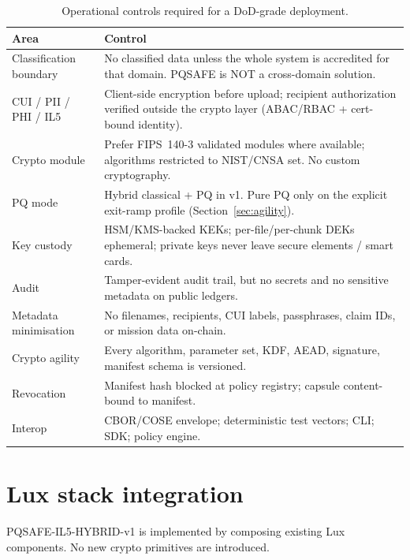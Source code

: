 \documentclass[11pt,a4paper]{article}
\begin{document}
\begin{table}[H]
\centering
\small
\begin{tabularx}{\linewidth}{l X}
\toprule
\textbf{Area} & \textbf{Control} \\
\midrule
Classification boundary & No classified data unless the whole system is accredited for that domain. PQSAFE is NOT a cross-domain solution. \\
CUI / PII / PHI / IL5 & Client-side encryption before upload; recipient authorization verified outside the crypto layer (ABAC/RBAC + cert-bound identity). \\
Crypto module & Prefer FIPS~140-3 validated modules where available; algorithms restricted to NIST/CNSA set. No custom cryptography. \\
PQ mode & Hybrid classical + PQ in v1. Pure PQ only on the explicit exit-ramp profile (Section~\ref{sec:agility}). \\
Key custody & HSM/KMS-backed KEKs; per-file/per-chunk DEKs ephemeral; private keys never leave secure elements / smart cards. \\
Audit & Tamper-evident audit trail, but no secrets and no sensitive metadata on public ledgers. \\
Metadata minimisation & No filenames, recipients, CUI labels, passphrases, claim IDs, or mission data on-chain. \\
Crypto agility & Every algorithm, parameter set, KDF, AEAD, signature, manifest schema is versioned. \\
Revocation & Manifest hash blocked at policy registry; capsule content-bound to manifest. \\
Interop & CBOR/COSE envelope; deterministic test vectors; CLI; SDK; policy engine. \\
\bottomrule
\end{tabularx}
\caption{Operational controls required for a DoD-grade deployment.}
\end{table}

\section{Lux stack integration}
\label{sec:lux}

PQSAFE-IL5-HYBRID-v1 is implemented by composing existing Lux
components. No new crypto primitives are introduced.
\end{document}
